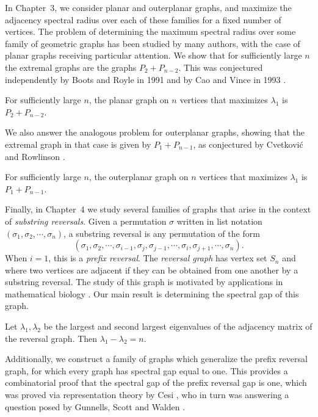 In Chapter~3, we consider planar and outerplanar graphs, and maximize the adjacency
spectral radius over each of these families for a fixed number of vertices.  The problem
of determining the maximum spectral radius over some family of geometric graphs has been
studied by many authors, with the case of planar graphs receiving particular attention.
We show that for sufficiently large $n$ the extremal graphs are the graphs $P_2 + P_{n-2}$.
This was conjectured independently by Boots and Royle in 1991 \cite{BootsRoyle1991} and
by Cao and Vince in 1993 \cite{CaoVince1993}.
\begin{theorem}
  For sufficiently large $n$, the planar graph on $n$ vertices that maximizes $\lambda_1$
  is $P_2 + P_{n-2}$.
\end{theorem}
\noindent We also answer the analogous problem for outerplanar graphs, showing that
the extremal graph in that case is given by $P_1 + P_{n-1}$, as conjectured
by Cvetkovi\'{c} and Rowlinson \cite{CvetkovicRowlinson1990}.
\begin{theorem}
  For sufficiently large $n$, the outerplanar graph on $n$ vertices that maximizes $\lambda_1$
  is $P_1 + P_{n-1}$.
\end{theorem}


Finally, in Chapter~4 we study several families of graphs that arise in the context
of \textit{substring reversals}.  Given a permutation $\sigma$ written in list notation
$(\sigma_1, \sigma_2, \cdots, \sigma_n)$, a substring reversal is any permutation
of the form
\[ (\sigma_1, \sigma_2, \cdots, \sigma_{i-1}, \sigma_j, \sigma_{j-1}, \cdots, \sigma_{i}, \sigma_{j+1}, \cdots, \sigma_n) .\]
When $i = 1$, this is a \textit{prefix reversal}.  The \textit{reversal graph} has vertex set $S_n$
and where two vertices are adjacent if they can be obtained from one another by a substring reversal.
The study of this graph is motivated by applications in mathematical biology \cite{BafnaPevzner1996}.
Our main result is determining the spectral gap of this graph.
\begin{theorem}
  Let $\lambda_1, \lambda_2$ be the largest and second largest eigenvalues
  of the adjacency matrix of the reversal graph.  Then $\lambda_1 - \lambda_2 = n$.
\end{theorem}
\noindent Additionally, we construct a family of graphs which generalize the prefix reversal graph,
for which every graph has spectral gap equal to one.  This provides a combinatorial
proof that the spectral gap of the prefix reversal gap is one, which was proved via
representation theory by Cesi \cite{Cesi2009}, who in turn was answering a question
posed by Gunnells, Scott and Walden \cite{GunnellsEtAl2007}.






